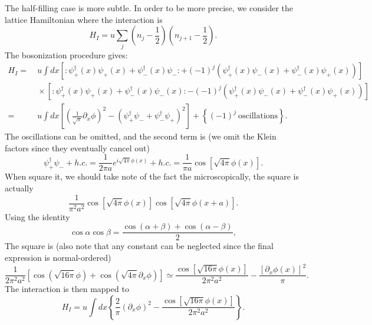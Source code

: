 \documentclass[aps,prb,superscriptaddress,nofootinbib]{revtex4}
\begin{document}
The half-filling case is more subtle.
In order to be more precise, we consider the lattice Hamiltonian where the interaction is
\begin{equation}
	H_I = u \sum_j \left(n_j-\frac{1}{2}\right) \left(n_{j+1}-\frac{1}{2} \right).
\end{equation}
The bosonization procedure gives:
\begin{equation}
\begin{aligned}
	H_I =& \ u \int dx \left[: \psi_+^{\dagger}(x) \psi_+(x)+\psi_-^{\dagger}(x) \psi_-:+(-1)^{j}\left(\psi_+^{\dagger}(x) \psi_-(x)+\psi_-^{\dagger}(x) \psi_+(x)\right)\right] \\
	&\ \times\left[: \psi_+^{\dagger}(x) \psi_+(x)+\psi_-^{\dagger}(x) \psi_-(x):-(-1)^{j}\left(\psi_+^{\dagger}(x) \psi_-(x)+\psi_-^{\dagger}(x) \psi_+(x)\right)\right] \\
	=&\ u\int dx \left[\left(\frac{1}{\sqrt{\pi}} \partial_{x} \phi\right)^{2}-\left(\psi_+^{\dagger} \psi_- + \psi_-^{\dagger} \psi_+\right)^{2} \right] 
		+\left\{(-1)^j\ \text{oscillations} \right\}.
\end{aligned}
\end{equation}
The oscillations can be omitted, and the second term is (we omit the Klein factors since they eventually cancel out)
\begin{equation}
	\psi_+^\dagger \psi_- + h.c.
	= \frac{1}{2\pi a} e^{i\sqrt{4\pi}\phi(x)} + h.c. 
	= \frac{1}{\pi a}\cos\left[\sqrt{4\pi}\phi(x)\right].
\end{equation}
When square it, we should take note of the fact the microscopically, the square is actually
\begin{equation*}
	\frac{1}{\pi^2 a^2} \cos\left[\sqrt{4\pi}\phi(x)\right]\cos\left[\sqrt{4\pi}\phi(x+a)\right].
\end{equation*}
Using the identity
\begin{equation}
	\cos\alpha \cos\beta = \frac{\cos(\alpha+\beta)+\cos(\alpha-\beta)}{2},
\end{equation}
The square is (also note that any constant can be neglected since the final expression is normal-ordered)
\begin{equation}
	\frac{1}{2\pi^2 a^2}\left[\cos\left(\sqrt{16\pi}\phi\right)+\cos\left(\sqrt{4\pi}\partial_x\phi \right)\right]
	\simeq \frac{\cos\left[\sqrt{16\pi}\phi(x)\right]}{2\pi^2 a^2} - \frac{[\partial_x\phi(x)]^2}{\pi}.
\end{equation}
The interaction is then mapped to
\begin{equation}
	H_I = u\int dx \left\{\frac{2}{\pi}(\partial_x\phi)^2 - \frac{\cos\left[\sqrt{16\pi}\phi(x)\right]}{2\pi^2 a^2}\right\}.
\end{equation}
\end{document}
